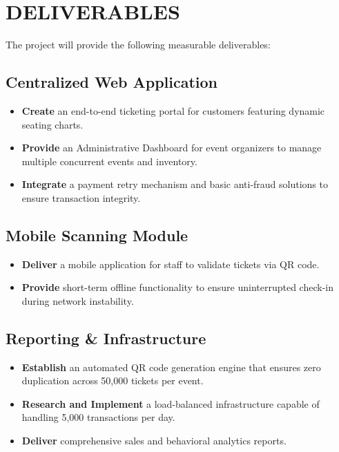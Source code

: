 \chapter{DELIVERABLES}

The project will provide the following measurable deliverables:

\section{Centralized Web Application}
\begin{itemize}
    \item \textbf{Create} an end-to-end ticketing portal for customers featuring dynamic seating charts.
    \item \textbf{Provide} an Administrative Dashboard for event organizers to manage multiple concurrent events and inventory.
    \item \textbf{Integrate} a payment retry mechanism and basic anti-fraud solutions to ensure transaction integrity.
\end{itemize}

\section{Mobile Scanning Module}
\begin{itemize}
    \item \textbf{Deliver} a mobile application for staff to validate tickets via QR code.
    \item \textbf{Provide} short-term offline functionality to ensure uninterrupted check-in during network instability.
\end{itemize}

\section{Reporting \& Infrastructure}
\begin{itemize}
    \item \textbf{Establish} an automated QR code generation engine that ensures zero duplication across 50,000 tickets per event.
    \item \textbf{Research and Implement} a load-balanced infrastructure capable of handling 5,000 transactions per day.
    \item \textbf{Deliver} comprehensive sales and behavioral analytics reports.
\end{itemize}

